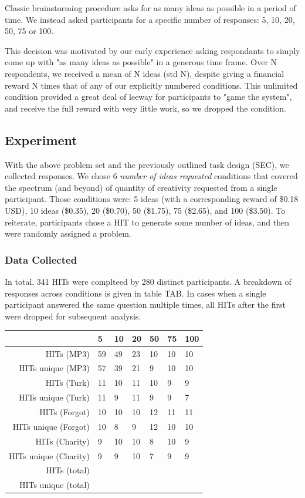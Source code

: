 Classic brainstorming procedure asks for as many ideas as possible in a period of time. We instead asked participants for a specific number of responses: 5, 10, 20, 50, 75 or 100.

This decision was motivated by our early experience asking respondants to simply come up with "as many ideas as possible" in a generous time frame. Over N respondents, we received a mean of N ideas (std N), despite giving a financial reward N times that of any of our explicitly numbered conditions. This unlimited condition provided a great deal of leeway for participants to "game the system", and receive the full reward with very little work, so we dropped the condition.

\subsection{Experiment}

With the above problem set and the previously outlined task design (SEC), we collected responses. We chose 6 \emph{number of ideas requested} conditions that covered the spectrum (and beyond) of quantity of creativity requested from a single participant. Those conditions were: 5 ideas (with a corresponding reward of \$0.18 USD), 10 ideas (\$0.35), 20 (\$0.70), 50 (\$1.75), 75 (\$2.65), and 100 (\$3.50). To reiterate, participants chose a HIT to generate some number of ideas, and then were randomly assigned a problem.

\subsubsection{Data Collected}

In total, 341 HITs were complteed by 280 distinct participants. A breakdown of responses across conditions is given in table TAB. In cases when a single participant answered the same question multiple times, all HITs after the first were dropped for subsequent analysis.

\begin{tabular}[h!]{r | l l l l l l }
& 5 & 10 & 20 & 50 & 75 & 100 \\ \hline \hline
HITs (MP3) & 59 & 49 & 23 & 10 & 10 & 10 \\
HITs unique (MP3) & 57 & 39 & 21 & 9 & 10 & 10 \\ \hline
HITs (Turk) & 11 & 10 & 11 & 10 & 9 & 9 \\
HITs unique (Turk) & 11 & 9 & 11 & 9 & 9 & 7 \\ \hline
HITs (Forgot) & 10 & 10 & 10 & 12 & 11 & 11 \\
HITs unique (Forgot) & 10 & 8 & 9 & 12 & 10 & 10 \\ \hline
HITs (Charity) & 9 & 10 & 10 & 8 & 10 & 9 \\
HITs unique (Charity) & 9 & 9 & 10 & 7 & 9 & 9 \\ \hline
HITs (total) \\
HITs unique (total) \\ \hline
\end{tabular}

